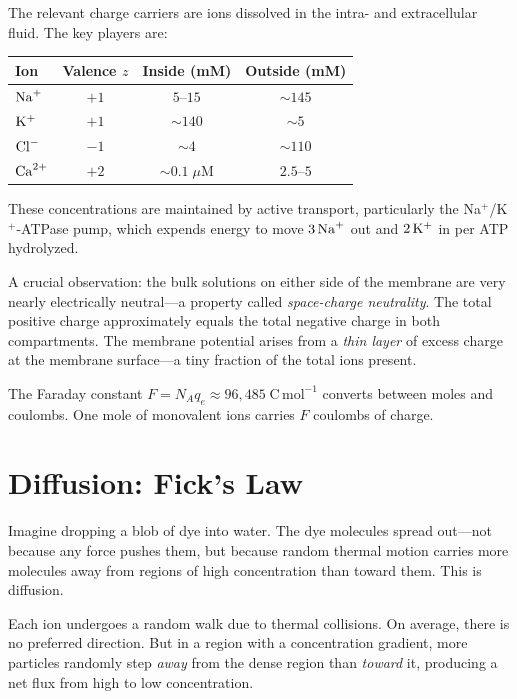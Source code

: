 The relevant charge carriers are ions dissolved in the intra- and extracellular fluid. The key players are:

\begin{center}
\begin{tabular}{@{}lccc@{}}
  \toprule
  \textbf{Ion} & \textbf{Valence} $z$ & \textbf{Inside} (mM) & \textbf{Outside} (mM) \\
  \midrule
  $\mathrm{Na}^+$   & $+1$ & $5$--$15$     & $\sim 145$  \\
  $\mathrm{K}^+$    & $+1$ & $\sim 140$    & $\sim 5$    \\
  $\mathrm{Cl}^-$   & $-1$ & $\sim 4$      & $\sim 110$  \\
  $\mathrm{Ca}^{2+}$   & $+2$ & $\sim 0.1\;\mu\text{M}$ & $2.5$--$5$ \\
  \bottomrule
\end{tabular}
\end{center}

These concentrations are maintained by active transport, particularly the Na$^+$/K$^+$-ATPase pump, which expends energy to move $3\,\mathrm{Na}^+$ out and $2\,\mathrm{K}^+$ in per ATP hydrolyzed.

A crucial observation: the bulk solutions on either side of the membrane are very nearly electrically neutral---a property called \emph{space-charge neutrality}. The total positive charge approximately equals the total negative charge in both compartments. The membrane potential arises from a \emph{thin layer} of excess charge at the membrane surface---a tiny fraction of the total ions present.

The Faraday constant $F = N_A q_e \approx 96{,}485\;\text{C}\,\text{mol}^{-1}$ converts between moles and coulombs. One mole of monovalent ions carries $F$ coulombs of charge.

\section{Diffusion: Fick's Law}
\label{sec:diffusion}

Imagine dropping a blob of dye into water. The dye molecules spread out---not because any force pushes them, but because random thermal motion carries more molecules away from regions of high concentration than toward them. This is diffusion.

\begin{aside}
Each ion undergoes a random walk due to thermal collisions. On average, there is no preferred direction. But in a region with a concentration gradient, more particles randomly step \emph{away} from the dense region than \emph{toward} it, producing a net flux from high to low concentration.
\end{aside}

